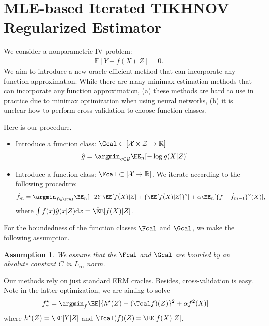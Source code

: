 \documentclass[12pt]{extarticle} %
\newtheorem{assumption}[theorem]{Assumption}
\begin{document}
\section{MLE-based Iterated TIKHNOV Regularized Estimator}
 We consider a nonparametric IV problem: 
\begin{align}\label{eq:inverse-iv}
    \mathbb{E}[Y-f(X)|Z]=0. 
\end{align}
We aim to introduce a new oracle-efficient method that can incorporate any function approximation. While there are many minimax estimation methods \citep{DikkalaNishanth2020MEoC} that can incorporate any function approximation, (a) these methods are hard to use in practice due to minimax optimization when using neural networks, (b) it is unclear how to perform cross-validation to choose function classes.  

Here is our procedure. 
\begin{itemize}    
    \item Introduce a function class: $\Gcal \subset [\mathcal{X}\times \mathcal{Z} \to \mathbb{R}]$
    \begin{align*}
        \hat g= \argmin_{g \in \mathcal{G}}\EE_n[-\log g(X|Z)]
    \end{align*}
     
    \item Introduce a function class: $\Fcal \subset [\mathcal{X} \to \mathbb{R}]$. We iterate according to the following procedure: 
    \begin{align}\label{eq:main-iter}
         \hat f_m =\argmin_{f \in \Fcal} 
       \EE_n[ - 2Y \hat \EE[f(X)|Z] +   \{\hat \EE[f(X)|Z]\}^2  ]   
         +\alpha \EE_n[\{f-\hat f_{m-1}\}^2(X)],
    \end{align}
     where $\int f(x)\hat g(x|Z)\mathrm{d}x = \mathrm{\hat \EE}[f(X)|Z]$.
\end{itemize}
For the boundedness of the function classes $\Fcal$ and $\Gcal$, we make the following assumption. \begin{assumption}
    We assume that the $\Fcal$ and $\Gcal$ are bounded by an absolute constant $C$ in $L_\infty$ norm.
\end{assumption}
Our methods rely on just standard ERM oracles. Besides, cross-validation is easy. 
Note in the latter optimization, we are aiming to solve 
\begin{align*}
        f^{\star}_{\alpha} &= \argmin_{f} \EE[\{h^{\star}(Z)  - (\Tcal f)(Z) \}^2 +\alpha f^2(X) ] 
\end{align*}
where $h^{\star}(Z)=\EE[Y|Z]$ and $\Tcal(f)(Z)=\EE[f(X)|Z]$. 
\end{document}
